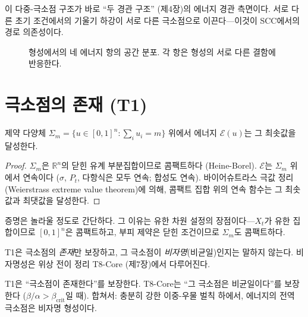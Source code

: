 이 다중-극소점 구조가 바로 ``두 경관 구조'' (제4장)의 에너지 경관 측면이다. 서로 다른 초기 조건에서의 기울기 하강이 서로 다른 극소점으로 이끈다---이것이 SCC에서의 경로 의존성이다.

\begin{figure}[t]
\centering
\caption{형성에서의 네 에너지 항의 공간 분포. 각 항은 형성의 서로 다른 결함에 반응한다.}
\label{fig:four-energies}
\end{figure}


\section{극소점의 존재 (T1)}
\label{sec:existence}

\begin{theorem}
\label{thm:T1}
제약 다양체 $\Sigma_m = \{u \in [0,1]^n : \sum_i u_i = m\}$ 위에서 에너지 $\mathcal{E}(u)$는 그 최솟값을 달성한다.
\end{theorem}

\begin{proof}
$\Sigma_m$은 $\mathbb{R}^n$의 닫힌 유계 부분집합이므로 콤팩트하다 (Heine-Borel). $\mathcal{E}$는 $\Sigma_m$ 위에서 연속이다 ($\sigma$, $P_t$, 다항식은 모두 연속; 합성도 연속). 바이어슈트라스 극값 정리(Weierstrass extreme value theorem)에 의해, 콤팩트 집합 위의 연속 함수는 그 최솟값과 최댓값을 달성한다.
\end{proof}

증명은 놀라울 정도로 간단하다. 그 이유는 유한 차원 설정의 장점이다---$X_t$가 유한 집합이므로 $[0,1]^n$은 콤팩트하고, 부피 제약은 닫힌 조건이므로 $\Sigma_m$도 콤팩트하다.

T1은 극소점의 \emph{존재}만 보장하고, 그 극소점이 \emph{비자명}(비균일)인지는 말하지 않는다. 비자명성은 위상 전이 정리 T8-Core (제7장)에서 다루어진다.

\begin{tcolorbox}[colback=green!5, colframe=green!50!black, title=주요 정리: T1에서 T8-Core로]
T1은 ``극소점이 존재한다''를 보장한다. T8-Core는 ``그 극소점은 비균일이다''를 보장한다 ($\beta/\alpha > \beta_{\mathrm{crit}}$일 때). 합쳐서: 충분히 강한 이중-우물 벌칙 하에서, 에너지의 전역 극소점은 비자명 형성이다.
\end{tcolorbox}


